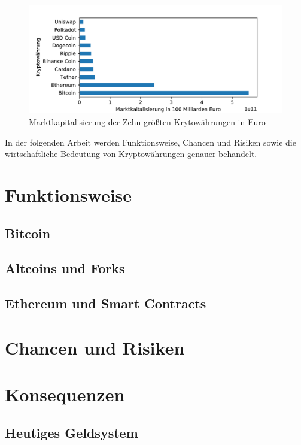 \documentclass[12pt,oneside]{article}
\begin{document}
\begin{figure}[h]
\includegraphics[scale=0.9]{./images/marketcap.pdf}
\caption{Marktkapitalisierung der Zehn größten Krytowährungen in Euro \cite{coinmarketcap}}
\centering
\end{figure}


In der folgenden Arbeit werden Funktionsweise, Chancen und Risiken sowie die wirtschaftliche Bedeutung von Kryptowährungen genauer behandelt.

\section{Funktionsweise}
\subsection{Bitcoin}
\subsection{Altcoins und Forks}
\subsection{Ethereum und Smart Contracts}

\section{Chancen und Risiken}


\section{Konsequenzen}

\subsection{Heutiges Geldsystem}

\clearpage
\lhead{}
\printbibliography
{}



\end{document}
